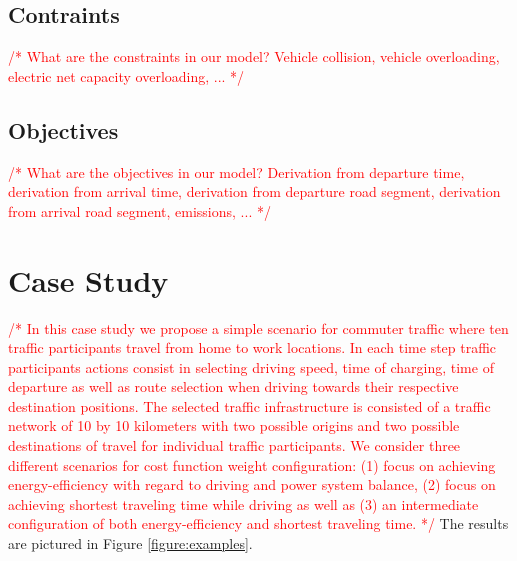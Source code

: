 \documentclass[conference]{IEEEtran}
\newcommand{\todo}[1]{\textcolor{red}{/* #1 */}}
\begin{document}
	\subsection{Contraints}
	
	\todo{What are the constraints in our model? Vehicle collision, vehicle overloading, electric net capacity overloading, ...}
	
	\subsection{Objectives}
	
	\todo{What are the objectives in our model? Derivation from departure time, derivation from arrival time, derivation from departure road segment, derivation from arrival road segment, emissions, ...}
	
	\section{Case Study}
	\label{case}
	
	\todo{In this case study we propose a simple scenario for commuter traffic where ten traffic participants travel from home to work locations. In each time step traffic participants actions consist in selecting driving speed, time of charging, time of departure as well as route selection when driving towards their respective destination positions. The selected traffic infrastructure is consisted of a traffic network of 10 by 10 kilometers with two possible origins and two possible destinations of travel for individual traffic participants. We consider three different scenarios for cost function weight configuration: (1) focus on achieving energy-efficiency with regard to driving and power system balance, (2) focus on achieving shortest traveling time while driving as well as (3) an intermediate configuration of both energy-efficiency and shortest traveling time.}
	The results are pictured in Figure \ref{figure:examples}. 
	
\end{document}
